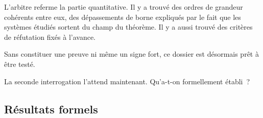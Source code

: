\begin{boiteArbitre}
L'arbitre referme la partie quantitative. Il y a
trouv\'e des ordres de grandeur coh\'erents entre eux, des d\'epassements de
borne expliqu\'es par le fait que les syst\`emes \'etudi\'es sortent du champ du
th\'eor\`eme. Il y a aussi trouv\'e des crit\`eres de r\'efutation fix\'es \`a l'avance.

Sans constituer une preuve ni m\^eme un signe fort, ce dossier est d\'esormais pr\^et \`a
\^etre test\'e.

La seconde interrogation l'attend maintenant. Qu'a-t-on
formellement \'etabli~?
\end{boiteArbitre}

\subsection{R\'esultats formels}
\label{subsec:resultats_formels}
